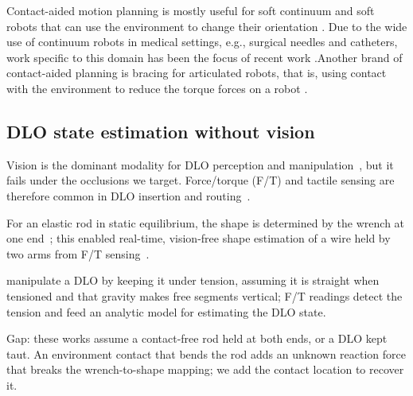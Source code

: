 Contact-aided motion planning is mostly useful for soft continuum and soft robots that can use the environment to change their orientation \cite{marchese2016dynamics,rao2024towards}. Due to the wide use of continuum robots in medical settings, e.g., surgical needles and catheters, work specific to this domain has been the focus of recent work \cite{ng2025contact,11373832}.Another brand of contact-aided planning is bracing for articulated robots, that is, using contact with the environment to reduce the torque forces on a robot \cite{fang2019exploitation,natarajan2023torque}.




\subsection{DLO state estimation without vision}
\begin{outline}
  \item Vision is the dominant modality for DLO perception and
    manipulation~\cite{sanchez2018survey}, but it fails under the occlusions we
    target. Force/torque (F/T) and tactile sensing are therefore common in DLO
    insertion and
    routing~\cite{kr-aecsagphi-22,nkot-sditfw-97,slk-ftmdloeffi-22,wjly-cratmp-22,zdpp-dhattfmn-19,lvw-crcrisb-24}.
  \item For an elastic rod in static equilibrium, the shape is determined by
    the wrench at one end~\cite{bretl2014quasistatic}; this enabled real-time,
    vision-free shape estimation of a wire held by two arms from F/T
    sensing~\cite{mishani2022realtime}.
  \item \citet{slk-ftmdloeffi-22} manipulate a DLO by keeping it under tension,
    assuming it is straight when tensioned and that gravity makes free segments
    vertical; F/T readings detect the tension and feed an analytic model for
    estimating the DLO state.
  \item Gap: these works assume a contact-free rod held at both ends, or a DLO
    kept taut. An environment contact that bends the rod adds an unknown
    reaction force that breaks the wrench-to-shape mapping; we add the contact
    location to recover it.
\end{outline}

